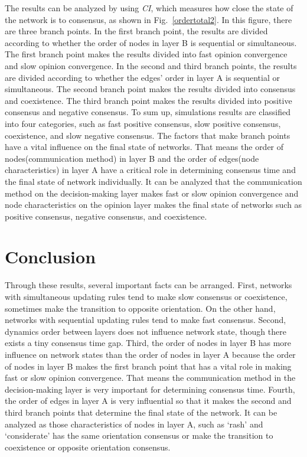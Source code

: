 The results can be analyzed by using \textit{CI}, which measures how close the state of the network is to consensus, as shown in Fig.~\ref{ordertotal2}. In this figure, there are three branch points. In the first branch point, the results are divided according to whether the order of nodes in layer B is sequential or simultaneous. The first branch point makes the results divided into fast opinion convergence and slow opinion convergence. In the second and third branch points, the results are divided according to whether the edges' order in layer A is sequential or simultaneous. The second branch point makes the results divided into consensus and coexistence. The third branch point makes the results divided into positive consensus and negative consensus. To sum up, simulations results are classified into four categories, such as fast positive consensus, slow positive consensus, coexistence, and slow negative consensus. The factors that make branch points have a vital influence on the final state of networks. That means the order of nodes(communication method) in layer B and the order of edges(node characteristics) in layer A have a critical role in determining consensus time and the final state of network individually. It can be analyzed that the communication method on the decision-making layer makes fast or slow opinion convergence and node characteristics on the opinion layer makes the final state of networks such as positive consensus, negative consensus, and coexistence. \\

\section{Conclusion}
Through these results, several important facts can be arranged. First, networks with simultaneous updating rules tend to make slow consensus or coexistence, sometimes make the transition to opposite orientation. On the other hand, networks with sequential updating rules tend to make fast consensus. Second, dynamics order between layers does not influence network state, though there exists a tiny consensus time gap. Third, the order of nodes in layer B has more influence on network states than the order of nodes in layer A because the order of nodes in layer B makes the first branch point that has a vital role in making fast or slow opinion convergence. That means the communication method in the decision-making layer is very important for determining consensus time. Fourth, the order of edges in layer A is very influential so that it makes the second and third branch points that determine the final state of the network. It can be analyzed as those characteristics of nodes in layer A, such as `rash' and `considerate' has the same orientation consensus or make the transition to coexistence or opposite orientation consensus.\\




